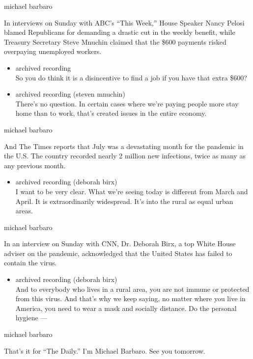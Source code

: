 michael barbaro

In interviews on Sunday with ABC's ``This Week,'' House Speaker Nancy
Pelosi blamed Republicans for demanding a drastic cut in the weekly
benefit, while Treasury Secretary Steve Mnuchin claimed that the \$600
payments risked overpaying unemployed workers.

\begin{itemize}
\item
  archived recording\\
  So you do think it is a disincentive to find a job if you have that
  extra \$600?
\item
  archived recording (steven mnuchin)\\
  There's no question. In certain cases where we're paying people more
  stay home than to work, that's created issues in the entire economy.
\end{itemize}

michael barbaro

And The Times reports that July was a devastating month for the pandemic
in the U.S. The country recorded nearly 2 million new infections, twice
as many as any previous month.

\begin{itemize}
\tightlist
\item
  archived recording (deborah birx)\\
  I want to be very clear. What we're seeing today is different from
  March and April. It is extraordinarily widespread. It's into the rural
  as equal urban areas.
\end{itemize}

michael barbaro

In an interview on Sunday with CNN, Dr. Deborah Birx, a top White House
adviser on the pandemic, acknowledged that the United States has failed
to contain the virus.

\begin{itemize}
\tightlist
\item
  archived recording (deborah birx)\\
  And to everybody who lives in a rural area, you are not immune or
  protected from this virus. And that's why we keep saying, no matter
  where you live in America, you need to wear a mask and socially
  distance. Do the personal hygiene ---
\end{itemize}

michael barbaro

That's it for ``The Daily.'' I'm Michael Barbaro. See you tomorrow.

